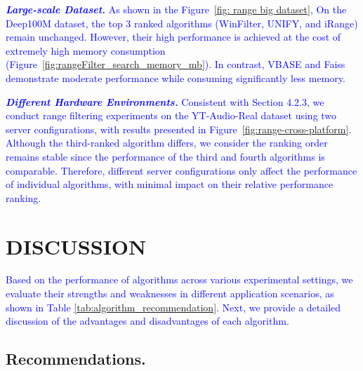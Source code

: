 \documentclass[sigconf, nonacm]{acmart}
\begin{document}
{	\textit{\textbf{\textcolor{blue}{Large-scale Dataset.}}} \textcolor{blue}{As shown in the Figure~\ref{fig: range big dataset}, On the Deep100M dataset, the top 3 ranked algorithms (WinFilter, UNIFY, and iRange) remain unchanged. However, their high performance is achieved at the cost of extremely high memory consumption (Figure~\ref{fig:rangeFilter_search_memory_mb}). In contrast, VBASE and Faiss demonstrate moderate performance while consuming significantly less memory.}
		
	\textit{\textbf{\textcolor{blue}{Different Hardware Environments.}}} 
	\textcolor{blue}{Consistent with Section 4.2.3, we conduct range filtering experiments on the YT-Audio-Real dataset using two server configurations, with results presented in Figure~\ref{fig:range-cross-platform}. Although the third-ranked algorithm differs, we consider the ranking order remains stable since the performance of the third and fourth algorithms is comparable. Therefore, different server configurations only affect the performance of individual algorithms, with minimal impact on their relative performance ranking.}  
	

	
	
	\section{DISCUSSION}
	\textcolor{blue}{Based on the performance of algorithms across various experimental settings, we evaluate their strengths and weaknesses in different application scenarios, as shown in Table \ref{tab:algorithm_recommendation}. Next, we provide a detailed discussion of the advantages and disadvantages of each algorithm.}
	
	
	
	\subsection{Recommendations.}
	
}
\end{document}
